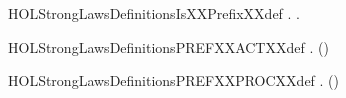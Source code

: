 \newcommand{\HOLStrongLawsDefinitionsCCSXXSIGMAXXdef}{\UseVerbatim{HOLStrongLawsDefinitionsCCSXXSIGMAXXdef}}
\begin{SaveVerbatim}{HOLStrongLawsDefinitionsIsXXPrefixXXdef}
\HOLTokenTurnstile{} \HOLSymConst{\HOLTokenForall{}}.   \HOLSymConst{\HOLTokenEquiv{}} \HOLSymConst{\HOLTokenExists{}} .  \HOLSymConst{=} 
\end{SaveVerbatim}
\newcommand{\HOLStrongLawsDefinitionsIsXXPrefixXXdef}{\UseVerbatim{HOLStrongLawsDefinitionsIsXXPrefixXXdef}}
\begin{SaveVerbatim}{HOLStrongLawsDefinitionsPREFXXACTXXdef}
\HOLTokenTurnstile{} \HOLSymConst{\HOLTokenForall{}} .  () \HOLSymConst{=} 
\end{SaveVerbatim}
\newcommand{\HOLStrongLawsDefinitionsPREFXXACTXXdef}{\UseVerbatim{HOLStrongLawsDefinitionsPREFXXACTXXdef}}
\begin{SaveVerbatim}{HOLStrongLawsDefinitionsPREFXXPROCXXdef}
\HOLTokenTurnstile{} \HOLSymConst{\HOLTokenForall{}} .  () \HOLSymConst{=} 
\end{SaveVerbatim}
\newcommand{\HOLStrongLawsDefinitionsPREFXXPROCXXdef}{\UseVerbatim{HOLStrongLawsDefinitionsPREFXXPROCXXdef}}
